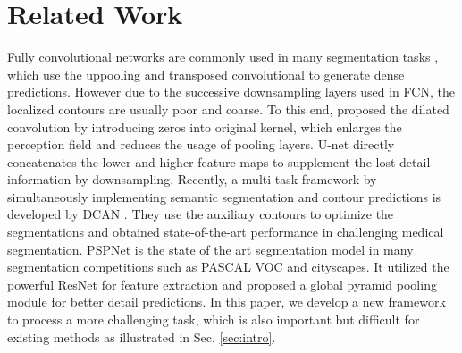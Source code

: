 \section{Related Work}
%


Fully convolutional networks are commonly used in many segmentation tasks \cite{Long2015,Badrinarayanan2015,Noh2015,Ronneberger2015,Chen2016a,Chen2017,Zhao2016}, which use the uppooling \cite{Badrinarayanan2015} and transposed convolutional \cite{Noh2015} to generate dense predictions.
However due to the successive downsampling layers used in FCN, the localized contours are usually poor and coarse.
To this end, \cite{Chen2016a} proposed the dilated convolution by introducing zeros into original kernel, which enlarges the perception field and reduces the usage of pooling layers.
U-net \cite{Ronneberger2015} directly concatenates the lower and higher feature maps to supplement the lost detail information by downsampling.
Recently, a multi-task framework by simultaneously implementing semantic segmentation and contour predictions is developed by DCAN \cite{Chen2017}.
They use the auxiliary contours to optimize the segmentations and obtained state-of-the-art performance in challenging medical segmentation. 
PSPNet \cite{Zhao2016} is the state of the art segmentation model in many segmentation competitions such as PASCAL VOC and cityscapes.
It utilized the powerful ResNet \cite{He2016} for feature extraction and proposed a global pyramid pooling module for better detail predictions.
In this paper, we develop a new framework to process a more challenging task, which is also important but difficult for existing methods as illustrated in Sec. \ref{sec:intro}. 

